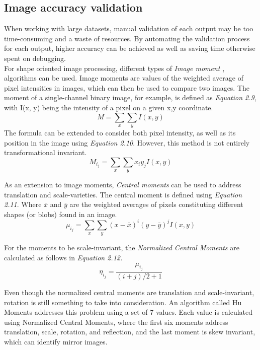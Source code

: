 \subsection{Image accuracy validation}
When working with large datasets, manual validation of each output may be too time-consuming and a waste of resources. By automating the validation process for each output, higher accuracy can be achieved as well as saving time otherwise spent on debugging.  \\

\noindent For shape oriented image processing, different types of \textit{Image moment} \cite{Huang},\cite{Chaumette} algorithms can be used. Image moments are values of the weighted average of pixel intensities in images, which can then be used to compare two images. The moment of a single-channel binary image, for example, is defined as \textit{Equation 2.9}, with I(x, y) being the intensity of a pixel on a given x,y coordinate. \begin{equation}
    M = \sum_x \sum_y{I(x, y)}
\end{equation} The formula can be extended to consider both pixel intensity, as well as its position in the image using \textit{Equation 2.10}. However, this method is not entirely transformational invariant.\\ \begin{equation}
    M_i_j = \sum_x \sum_y{x_iy_jI(x, y)}
\end{equation} 

\noindent As an extension to image moments, \textit{Central moments} can be used to address translation and scale-varieties. The central moment is defined using \textit{Equation 2.11}. Where $\overline{x}$ and $\overline{y}$ are the weighted averages of pixels constituting different shapes (or blobs) found in an image.\\

\begin{equation}
    \mu_i_j = \sum_x \sum_y{(x - \bar{x})^i(y - \bar{y})^jI(x, y)}
\end{equation}  
 
\noindent For the moments to be scale-invariant, the \textit{Normalized Central Moments} are calculated as follows in \textit{Equation 2.12.}\\
\begin{equation}
    \eta_i_j = \frac{\mu_i_j}{(i+j)/2+1}
\end{equation} 
 
\noindent Even though the normalized central moments are translation and scale-invariant, rotation is still something to take into consideration. An algorithm called Hu Moments addresses this problem using a set of 7 values. Each value is calculated using Normalized Central Moments, where the first six moments address translation, scale, rotation, and reflection, and the last moment is skew invariant, which can identify mirror images.






